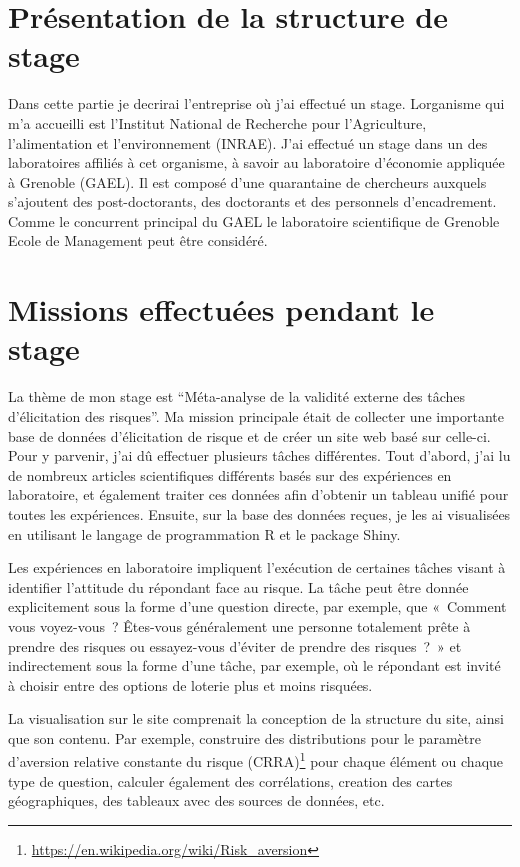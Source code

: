 \documentclass[12pt]{article}
\begin{document}
\section{Présentation de la structure de stage}
\label{sec:second}

Dans cette partie je decrirai l'entreprise où j'ai effectué un stage.
Lorganisme qui m'a accueilli est l'Institut National de Recherche pour
l'Agriculture, l'alimentation et l'environnement (INRAE). J'ai effectué
un stage dans un des laboratoires affiliés à cet organisme, à savoir au
laboratoire d'économie appliquée à Grenoble (GAEL). Il est composé d'une
quarantaine de chercheurs auxquels s'ajoutent des post-doctorants, des
doctorants et des personnels d'encadrement. Comme le concurrent
principal du GAEL le laboratoire scientifique de Grenoble Ecole de
Management peut être considéré.

\section{Missions effectuées pendant le stage}
\label{sec:third}

La thème de mon stage est ``Méta-analyse de la validité externe des
tâches d'élicitation des risques''. Ma mission principale était de
collecter une importante base de données d'élicitation de risque et de
créer un site web basé sur celle-ci. Pour y parvenir, j'ai dû effectuer
plusieurs tâches différentes. Tout d'abord, j'ai lu de nombreux articles
scientifiques différents basés sur des expériences en laboratoire, et
également traiter ces données afin d'obtenir un tableau unifié pour
toutes les expériences. Ensuite, sur la base des données reçues, je les
ai visualisées en utilisant le langage de programmation R et le package
Shiny.

Les expériences en laboratoire impliquent l'exécution de certaines
tâches visant à identifier l'attitude du répondant face au risque. La
tâche peut être donnée explicitement sous la forme d'une question
directe, par exemple, que «~Comment vous voyez-vous~? Êtes-vous
généralement une personne totalement prête à prendre des risques ou
essayez-vous d'éviter de prendre des risques~?~» et indirectement sous
la forme d'une tâche, par exemple, où le répondant est invité à choisir
entre des options de loterie plus et moins risquées.

La visualisation sur le site comprenait la conception de la structure du
site, ainsi que son contenu. Par exemple, construire des distributions
pour le paramètre d'aversion relative constante du risque
(CRRA)\footnote{\url{https://en.wikipedia.org/wiki/Risk_aversion}} pour
chaque élément ou chaque type de question, calculer également des
corrélations, creation des cartes géographiques, des tableaux avec des
sources de données, etc.
\end{document}
